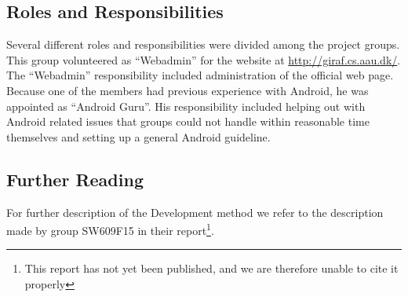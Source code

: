 \subsection{Roles and Responsibilities}
Several different roles and responsibilities were divided among the project groups. This group volunteered as ``Webadmin'' for the website at \url{http://giraf.cs.aau.dk/}. The ``Webadmin'' responsibility included administration of the official \giraf web page. Because one of the members had previous experience with Android, he was appointed as ``Android Guru''. His responsibility included helping out with Android related issues that groups could not handle within reasonable time themselves and setting up a general Android guideline. 

\subsection{Further Reading}
For further description of the \giraf Development method we refer to the description made by group SW609F15 in their report\footnote{This report has not yet been published, and we are therefore unable to cite it properly}.